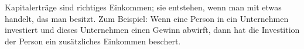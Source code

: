 Kapitalerträge sind richtiges Einkommen; sie entstehen, wenn man mit etwas handelt, das man besitzt.
Zum Beispiel: Wenn eine Person in ein Unternehmen investiert und dieses Unternehmen einen Gewinn abwirft, dann hat die Investition der Person ein zusätzliches Einkommen beschert.